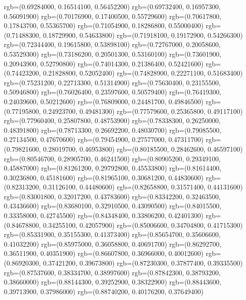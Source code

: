 {{        rgb=(0.69284000, 0.16514100, 0.56452200)
        rgb=(0.69732400, 0.16957300, 0.56091900)
        rgb=(0.70176900, 0.17400500, 0.55729600)
        rgb=(0.70617800, 0.17843700, 0.55365700)
        rgb=(0.71054900, 0.18286800, 0.55000400)
        rgb=(0.71488300, 0.18729900, 0.54633800)
        rgb=(0.71918100, 0.19172900, 0.54266300)
        rgb=(0.72344400, 0.19615800, 0.53898100)
        rgb=(0.72767000, 0.20058600, 0.53529300)
        rgb=(0.73186200, 0.20501300, 0.53160100)
        rgb=(0.73601900, 0.20943900, 0.52790800)
        rgb=(0.74014300, 0.21386400, 0.52421600)
        rgb=(0.74423200, 0.21828800, 0.52052400)
        rgb=(0.74828900, 0.22271100, 0.51683400)
        rgb=(0.75231200, 0.22713300, 0.51314900)
        rgb=(0.75630400, 0.23155500, 0.50946800)
        rgb=(0.76026400, 0.23597600, 0.50579400)
        rgb=(0.76419300, 0.24039600, 0.50212600)
        rgb=(0.76809000, 0.24481700, 0.49846500)
        rgb=(0.77195800, 0.24923700, 0.49481300)
        rgb=(0.77579600, 0.25365800, 0.49117100)
        rgb=(0.77960400, 0.25807800, 0.48753900)
        rgb=(0.78338300, 0.26250000, 0.48391800)
        rgb=(0.78713300, 0.26692200, 0.48030700)
        rgb=(0.79085500, 0.27134500, 0.47670600)
        rgb=(0.79454900, 0.27577000, 0.47311700)
        rgb=(0.79821600, 0.28019700, 0.46953800)
        rgb=(0.80185500, 0.28462600, 0.46597100)
        rgb=(0.80546700, 0.28905700, 0.46241500)
        rgb=(0.80905200, 0.29349100, 0.45887000)
        rgb=(0.81261200, 0.29792800, 0.45533800)
        rgb=(0.81614400, 0.30236800, 0.45181600)
        rgb=(0.81965100, 0.30681200, 0.44830600)
        rgb=(0.82313200, 0.31126100, 0.44480600)
        rgb=(0.82658800, 0.31571400, 0.44131600)
        rgb=(0.83001800, 0.32017200, 0.43783600)
        rgb=(0.83342200, 0.32463500, 0.43436600)
        rgb=(0.83680100, 0.32910500, 0.43090500)
        rgb=(0.84015500, 0.33358000, 0.42745500)
        rgb=(0.84348400, 0.33806200, 0.42401300)
        rgb=(0.84678800, 0.34255100, 0.42057900)
        rgb=(0.85006600, 0.34704800, 0.41715300)
        rgb=(0.85331900, 0.35155300, 0.41373400)
        rgb=(0.85654700, 0.35606600, 0.41032200)
        rgb=(0.85975000, 0.36058800, 0.40691700)
        rgb=(0.86292700, 0.36511900, 0.40351900)
        rgb=(0.86607800, 0.36966000, 0.40012600)
        rgb=(0.86920300, 0.37421200, 0.39673800)
        rgb=(0.87230300, 0.37877400, 0.39335500)
        rgb=(0.87537600, 0.38334700, 0.38997600)
        rgb=(0.87842300, 0.38793200, 0.38660000)
        rgb=(0.88144300, 0.39252900, 0.38322900)
        rgb=(0.88443600, 0.39713900, 0.37986000)
        rgb=(0.88740200, 0.40176200, 0.37649400)
}}
